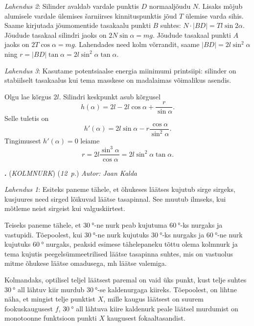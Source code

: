 \documentclass[11pt,a5paper]{article}
\newcommand{\numb}[1]{\vspace{5pt}\textbf{\large #1}}
\newcommand{\nimi}[1]{(\textsl{\small \uppercase{#1}})}
\newcommand{\punktid}[1]{(\emph{#1~p.})}
\newcounter{ylesanne}
\newcommand{\yl}[1]{\addtocounter{ylesanne}{1}\numb{\theylesanne.} \nimi{#1} \newblock{}}
\newcommand{\autor}[1]{\emph{Autor: #1}}%
\begin{document}
\textit{Lahendus 2}: Silinder avaldab vardale punktis $D$ normaaljõudu $N$. Lisaks mõjub alumisele vardale ülemises šarniirses kinnituspunktis jõud $T$ ülemise varda sihis. Saame kirjutada jõumomentide tasakaalu punkti $B$ suhtes: $N \cdot |BD| =Tl\sin2\alpha$. Jõudude tasakaal silindri jaoks on $2N\sin\alpha=mg$. Jõudude tasakaal punkti $A$ jaoks on $2T\cos\alpha=mg$. Lahendades need kolm võrrandit, saame $|BD|=2l\sin^2\alpha$ ning $r=|BD|\tan\alpha=2l\sin^2\alpha \tan\alpha$.

\textit{Lahendus 3}: Kasutame potentsiaalse energia miinimumi printsiipi: silinder on stabiilselt tasakaalus kui tema masskese on madalaimas võimalikus asendis.

Olgu lae kõrgus $2l$. Silindri keskpunkt asub kõrgusel
\[
  h(\alpha)=2l-2l\cos\alpha + \frac{r}{\sin\alpha}.
\]
Selle tuletis on
\[
  h'(\alpha)=2l\sin\alpha - r\frac{\cos\alpha}{\sin^2\alpha}.
\]
Tingimusest $h'(\alpha)=0$ leiame
\[
  r=2l\frac{\sin^3\alpha}{\cos\alpha}=2l\sin^2\alpha \tan\alpha.
\]

\yl{Kolmnurk}
\punktid{12} \autor{Jaan Kalda}

\textit{Lahendus 1}:
Esiteks paneme tähele, et õhukeses läätses kujutub sirge sirgeks, kusjuures need sirged lõikuvad läätse tasapinnal. See muutub ilmseks, kui mõtleme neist sirgeist kui valguskiirtest.

Teiseks paneme tähele, et $\SI{30}{\degree}$-ne nurk peab kujutuma  $\SI{60}\degree$-ks nurgaks ja vastupidi. Tõepoolest, kui  $\SI{30}\degree$-ne nurk kujutuks  $\SI{30}\degree$-ks nurgaks ja  $\SI{60}\degree$-ne nurk kujutuks  $\SI{60}\degree$ nurgaks, peaksid esimese tähelepaneku tõttu olema kolmnurk ja tema kujutis peegelsümmeetrilised läätse tasapinna suhtes, mis on vastuolus mitme õhukese läätse omadusega, mh läätse valemiga.

Kolmandaks, optilisel teljel läätsest paremal on vaid üks punkt, kust telje suhtes $\SI{30}\degree$ all lähtuv kiir murdub  $\SI{30}\degree$-se kaldenurgaga kiireks. Tõepoolest, on lihtne näha, et mingist telje punktist $X$, mille kaugus läätsest on suurem fookuskaugusest $f$, $\SI{30}\degree$  all lähtuva kiire kaldenurk peale läätsel murdumist on monotoonne funktsioon punkti $X$ kaugusest fokaaltasandist.
\end{document}
